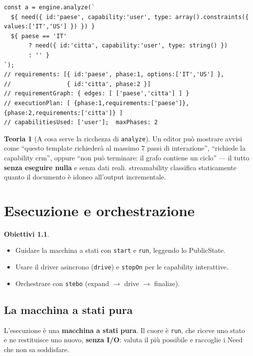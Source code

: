 \documentclass[11pt,a4paper]{book}
\let\code\lstinline
\newcommand{\ic}[1]{{\ttfamily #1}}
\theoremstyle{definition}
\newtheorem*{obiettivi}{Obiettivi}
\newtheorem*{teoria}{Teoria}
\begin{document}
{{{{\begin{lstlisting}
const a = engine.analyze(`
  ${ need({ id:'paese', capability:'user', type: array().constraints({ values:['IT','US'] }) }) }
  ${ paese == 'IT'
       ? need({ id:'citta', capability:'user', type: string() })
       : '' }
`);
// requirements: [{ id:'paese', phase:1, options:['IT','US'] },
//                { id:'citta', phase:2 }]
// requirementGraph: { edges: [ ['paese','citta'] ] }
// executionPlan: [ {phase:1,requirements:['paese']}, {phase:2,requirements:['citta']} ]
// capabilitiesUsed: ['user'];  maxPhases: 2
\end{lstlisting}

\begin{teoria}[A cosa serve la ricchezza di \texttt{analyze}]
Un editor può mostrare avvisi come ``questo template richiederà al massimo 7 passi
di interazione'', ``richiede la capability \ic{crm}'', oppure ``non può terminare:
il grafo contiene un ciclo'' --- il tutto \textbf{senza eseguire nulla} e senza dati
reali. \ic{streamability} classifica staticamente quanto il documento è idoneo
all'output incrementale.
\end{teoria}

\chapter{Esecuzione e orchestrazione}
\label{ch:esecuzione}

\begin{obiettivi}
\begin{itemize}
  \item Guidare la macchina a stati con \code|start| e \code|run|, leggendo lo
    \ic{PublicState}.
  \item Usare il driver asincrono (\code|drive|) e \code|stopOn| per le capability
    interattive.
  \item Orchestrare con \code|stebo| (expand $\rightarrow$ drive $\rightarrow$
    finalize).
\end{itemize}
\end{obiettivi}

\section{La macchina a stati pura}

L'esecuzione è una \textbf{macchina a stati pura}. Il cuore è \code|run|, che riceve
uno stato e ne restituisce uno nuovo, \textbf{senza I/O}: valuta il più possibile e
raccoglie i \ic{Need} che non sa soddisfare.

}}}}
\end{document}
